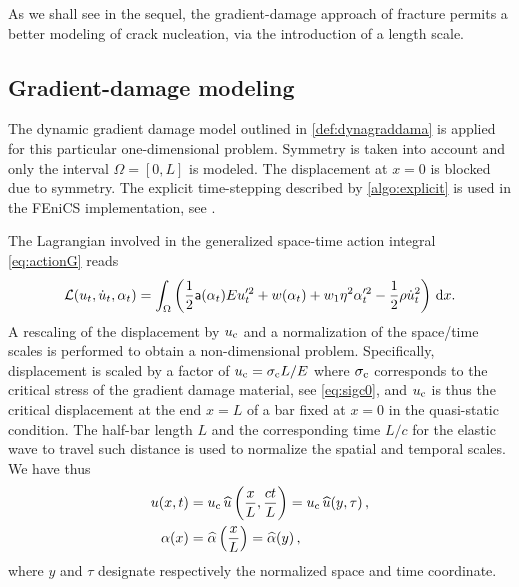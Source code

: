 As we shall see in the sequel, the gradient-damage approach of fracture permits a better modeling of crack nucleation, via the introduction of a length scale.

\subsection{Gradient-damage modeling}
The dynamic gradient damage model outlined in \cref{def:dynagraddama} is applied for this particular one-dimensional problem. Symmetry is taken into account and only the interval $\Omega=[0,L]$ is modeled. The displacement at $x=0$ is blocked due to symmetry. The explicit time-stepping described by \cref{algo:explicit} is used in the FEniCS implementation, see \cite{LiMaurini:2015}.

The Lagrangian involved in the generalized space-time action integral \eqref{eq:actionG} reads
\[
\mathcal{L}(u_t,\dot{u}_t,\alpha_t)=\int_\Omega\left(\frac{1}{2}\mathsf{a}(\alpha_t)Eu_t'^2+w(\alpha_t)+w_1\eta^2\alpha_t'^2-\frac{1}{2}\rho\dot{u}_t^2\right)\,\mathrm{d}x.
\]
A rescaling of the displacement by $u_{\mathrm{c}}$ and a normalization of the space/time scales is performed to obtain a non-dimensional problem. Specifically, displacement is scaled by a factor of $u_{\mathrm{c}}=\sigma_{\mathrm{c}} L/E$ where $\sigma_{\mathrm{c}}$ corresponds to the critical stress of the gradient damage material, see \eqref{eq:sigc0}, and $u_{\mathrm{c}}$ is thus the critical displacement at the end $x=L$ of a bar fixed at $x=0$ in the quasi-static condition. The half-bar length $L$ and the corresponding time $L/c$ for the elastic wave to travel such distance is used to normalize the spatial and temporal scales. We have thus
\begin{align}
u(x,t) &= u_{\mathrm{c}}\,\widehat{u}\left(\frac{x}{L},\frac{ct}{L}\right)=u_{\mathrm{c}}\,\widehat{u}(y,\tau)\,, \label{eq:uhat} \\
\alpha(x) &= \widehat{\alpha}\left(\frac{x}{L}\right)=\widehat{\alpha}(y)\,, \notag
\end{align}
where $y$ and $\tau$ designate respectively the normalized space and time coordinate.

